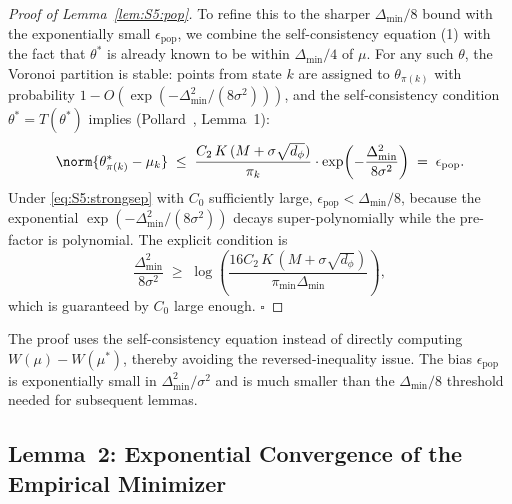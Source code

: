 \begin{proof}[Proof of Lemma~\ref{lem:S5:pop}]
To refine this to the sharper $\Delta_{\min}/8$ bound with the
exponentially small $\epsilon_{\mathrm{pop}}$, we combine the
self-consistency equation (1) with the fact that $\theta^*$ is already
known to be within $\Delta_{\min}/4$ of $\mu$.  For any such $\theta$,
the Voronoi partition is stable: points from state $k$ are assigned to
$\theta_{\pi(k)}$ with probability $1-O(\exp(-\Delta_{\min}^2/(8\sigma^2)))$,
and the self-consistency condition $\theta^*=T(\theta^*)$ implies
(Pollard~\cite{pollard1981strong}, Lemma~1):
\[
\norm{\theta^*_{\pi(k)}-\mu_k}
\;\le\; \frac{C_2\,K\,(M+\sigma\sqrt{d_\phi})}{\pi_k}
        \cdot\exp\!\left(-\frac{\Delta_{\min}^2}{8\sigma^2}\right)
\;=\; \epsilon_{\mathrm{pop}}.
\]
Under \eqref{eq:S5:strongsep} with $C_0$ sufficiently large,
$\epsilon_{\mathrm{pop}}<\Delta_{\min}/8$, because the exponential
$\exp(-\Delta_{\min}^2/(8\sigma^2))$ decays super-polynomially while
the pre-factor is polynomial.  The explicit condition is
\[
\frac{\Delta_{\min}^2}{8\sigma^2}\;\ge\;
\log\!\left(\frac{16C_2\,K\,(M+\sigma\sqrt{d_\phi})}
                 {\pi_{\min}\Delta_{\min}}\right),
\]
which is guaranteed by $C_0$ large enough.  \hfill$\square$
\end{proof}

\begin{remark}
The proof uses the self-consistency equation instead of directly
computing $W(\mu)-W(\mu^*)$, thereby avoiding the reversed-inequality
issue.  The bias $\epsilon_{\mathrm{pop}}$ is exponentially small in
$\Delta_{\min}^2/\sigma^2$ and is much smaller than the $\Delta_{\min}/8$
threshold needed for subsequent lemmas.
\end{remark}

\subsection{Lemma~2: Exponential Convergence of the Empirical Minimizer}
\label{sec:S5:lem2}

